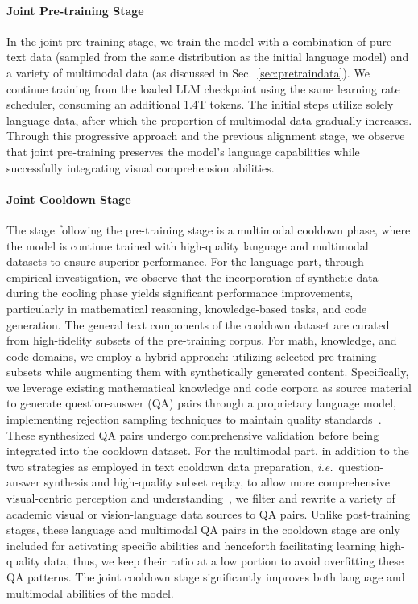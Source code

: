 \documentclass{article}
\newcommand{\citep}[1]{\parencite{#1}}
\begin{document}
\paragraph{Joint Pre-training Stage} In the joint pre-training stage, we train the model with a combination of pure text data (sampled from the same distribution as the initial language model) and a variety of multimodal data (as discussed in Sec.~\ref{sec:pretraindata}). We continue training from the loaded LLM checkpoint using the same learning rate scheduler, consuming an additional 1.4T tokens. The initial steps utilize solely language data, after which the proportion of multimodal data gradually increases. Through this progressive approach and the previous alignment stage, we observe that joint pre-training preserves the model's language capabilities while successfully integrating visual comprehension abilities.


\paragraph{Joint Cooldown Stage}

The stage following the pre-training stage is a multimodal cooldown phase, where the model is continue trained with high-quality language and multimodal datasets to ensure superior performance. 
For the language part, through empirical investigation, we observe that the incorporation of synthetic data during the cooling phase yields significant performance improvements, particularly in mathematical reasoning, knowledge-based tasks, and code generation. The general text components of the cooldown dataset are curated from high-fidelity subsets of the pre-training corpus. For math, knowledge, and code domains, we employ a hybrid approach: utilizing selected pre-training subsets while augmenting them with synthetically generated content. Specifically, we leverage existing mathematical knowledge and code corpora as source material to generate question-answer (QA) pairs through a proprietary language model, implementing rejection sampling techniques to maintain quality standards~\citep{yue2023mammoth,su2024nemotron}. These synthesized QA pairs undergo comprehensive validation before being integrated into the cooldown dataset. For the multimodal part, in addition to the two strategies as employed in text cooldown data preparation, \textit{i.e.}~question-answer synthesis and high-quality subset replay, to allow more comprehensive visual-centric perception and understanding~\citep{li2024llavaonevisioneasyvisualtask,tong2024cambrian1fullyopenvisioncentric,guo2024mammothvlelicitingmultimodalreasoning}, we filter and rewrite a variety of academic visual or vision-language data sources to QA pairs. Unlike post-training stages, these language and multimodal QA pairs in the cooldown stage are only included for activating specific abilities and henceforth facilitating learning high-quality data, thus, we keep their ratio at a low portion to avoid overfitting these QA patterns. The joint cooldown stage significantly improves both language and multimodal abilities of the model.
\end{document}
